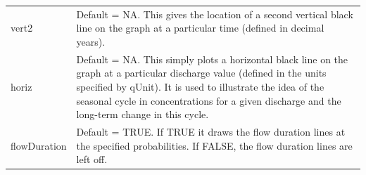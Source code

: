 \documentclass[a4paper,11pt]{article}
\begin{document}
\begin{table}[ht]
\begin{tabularx}{\textwidth}{lX}
vert2 & Default = NA.  This gives the location of a second vertical black line on the graph at a particular time (defined in decimal years). \\
horiz & Default = NA.  This simply plots a horizontal black line on the graph at a particular discharge value (defined in the units specified by qUnit).  It is used to illustrate the idea of the seasonal cycle in concentrations for a given discharge and the long-term change in this cycle.  \\
flowDuration & Default = TRUE.  If TRUE it draws the flow duration lines at the specified probabilities.  If FALSE, the flow duration lines are left off.\\
\hline
\end{tabularx}

\end{table}
\end{document}
